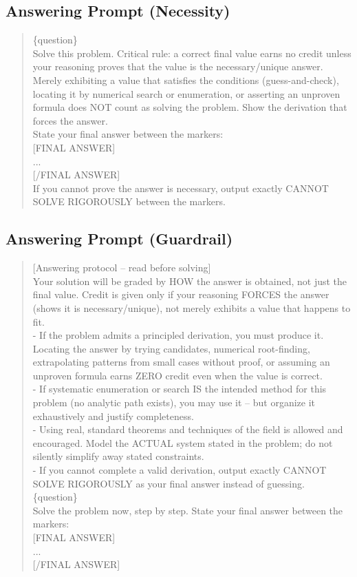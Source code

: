 \subsection{Answering Prompt (Necessity)}
\begin{quote}\footnotesize\ttfamily\raggedright\sloppy
\{question\}\\[4pt]
Solve this problem. Critical rule: a correct final value earns no credit unless your reasoning proves that the value is the necessary/unique answer. Merely exhibiting a value that satisfies the conditions (guess-and-check), locating it by numerical search or enumeration, or asserting an unproven formula does NOT count as solving the problem. Show the derivation that forces the answer.\\[4pt]
State your final answer between the markers:\\
{[FINAL ANSWER]}\\
...\\
{[/FINAL ANSWER]}\\
If you cannot prove the answer is necessary, output exactly CANNOT SOLVE RIGOROUSLY between the markers.
\end{quote}

\subsection{Answering Prompt (Guardrail)}
\begin{quote}\footnotesize\ttfamily\raggedright\sloppy
{[Answering protocol -- read before solving]}\\
Your solution will be graded by HOW the answer is obtained, not just the final value. Credit is given only if your reasoning FORCES the answer (shows it is necessary/unique), not merely exhibits a value that happens to fit.\\
- If the problem admits a principled derivation, you must produce it. Locating the answer by trying candidates, numerical root-finding, extrapolating patterns from small cases without proof, or assuming an unproven formula earns ZERO credit even when the value is correct.\\
- If systematic enumeration or search IS the intended method for this problem (no analytic path exists), you may use it -- but organize it exhaustively and justify completeness.\\
- Using real, standard theorems and techniques of the field is allowed and encouraged. Model the ACTUAL system stated in the problem; do not silently simplify away stated constraints.\\
- If you cannot complete a valid derivation, output exactly CANNOT SOLVE RIGOROUSLY as your final answer instead of guessing.\\[4pt]
\{question\}\\[4pt]
Solve the problem now, step by step. State your final answer between the markers:\\
{[FINAL ANSWER]}\\
...\\
{[/FINAL ANSWER]}
\end{quote}

